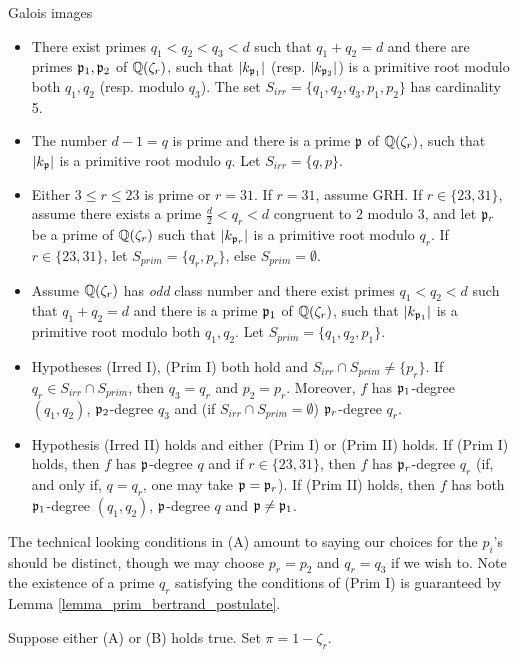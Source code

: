 \documentclass[11pt,a4paper]{article}
\newcommand{\Qr}{{\QQ(\zeta_r)}}
\newcommand{\zr}{\zeta_r}
\begin{document}
\begin{section}{Galois images}
\begin{itemize}
    \item[(Irred I)]  There exist primes $q_1 < q_2 <q_3<d$ such that $q_1+q_2 = d$ and there are primes $\mathfrak{p}_1,\mathfrak{p}_2$ of $\Qr$, such that  $|k_{\mathfrak{p}_1}|$ (resp. $|k_{\mathfrak{p}_2}|$) is a primitive root modulo both $q_1,q_2$ (resp. modulo $q_3$). The set $S_{irr}=\{q_1,q_2,q_3,p_1,p_2\}$ has cardinality 5.
    \item[(Irred II)] The number $d -1 = q$ is prime and there is a prime $\mathfrak{p}$ of $\Qr$, such that  $|k_{\mathfrak{p}}|$ is a primitive root modulo $q$. Let $S_{irr}=\{q, p\}$.
    \item[(Prim I)] Either $3 \leq r \leq 23$ is prime or $r =31$. If $r=31$, assume GRH. If $r \in \{23,31\}$, assume there exists a prime $\frac{d}{2}<q_r<d$ congruent to $2$ modulo $3$, and let $\mathfrak{p}_r$ be a prime of $\Qr$ such that $|k_{\mathfrak{p}_r}|$ is a primitive root modulo $q_r$. If $r \in \{23,31\}$, let $S_{prim}=\{q_r,p_r\}$, else $S_{prim}=\emptyset$.
    \item[(Prim II)]  Assume $\Qr$ has \emph{odd} class number and there exist primes $q_1 < q_2 <d$ such that $q_1+q_2 = d$ and there is a prime $\mathfrak{p}_1$ of $\Qr$, such that  $|k_{\mathfrak{p}_1}|$ is a primitive root modulo both $q_1,q_2$. Let $S_{prim} = \{q_1,q_2,p_1\}$.
    \item[(A)] Hypotheses (Irred I), (Prim I) both hold and $S_{irr} \cap S_{prim} \neq \{p_r\}$. If $q_r \in S_{irr}\cap S_{prim} $, then $q_3= q_r$ and $p_2= p_r$. Moreover, $f$ has $\mathfrak{p}_1$-degree $(q_1,q_2)$, $\mathfrak{p}_2$-degree $q_3$ and (if $S_{irr}\cap S_{prim} = \emptyset$) $\mathfrak{p}_r$-degree $q_r$.
    \item[(B)] Hypothesis (Irred II) holds and either (Prim I) or (Prim II) holds.
    If (Prim I) holds, then $f$ has $\mathfrak{p}$-degree $q$ and if $r \in \{23,31\}$, then $f$ has $\mathfrak{p}_r$-degree $q_r$ (if, and only if, $q=q_r$, one may take $\mathfrak{p}=\mathfrak{p}_r$). %
    If (Prim II) holds, then $f$ has both $\mathfrak{p}_1$-degree $(q_1,q_2)$, $\mathfrak{p}$-degree $q$ and $\mathfrak{p} \neq \mathfrak{p}_1$.
\end{itemize}
The technical looking conditions in (A) amount to saying our choices for the $p_i$'s should be distinct, though we may choose $p_r=p_2$ and $q_r=q_3$ if we wish to.
Note the existence of a prime $q_r$ satisfying the conditions of (Prim I) is guaranteed by Lemma \ref{lemma_prim_bertrand_postulate}.


\begin{theorem}
\label{thm_Glam_is_huge}
Suppose either (A) or (B) holds true.
Set $\pi = 1-\zr$.


\end{theorem}
\end{section}
\end{document}
